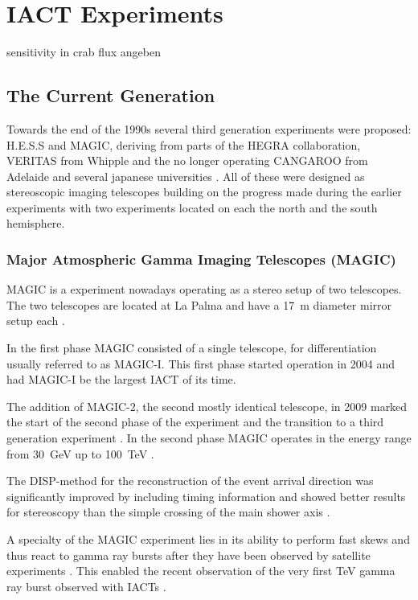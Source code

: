 \chapter{IACT Experiments}
\label{cta}

sensitivity in crab flux angeben

\section{The Current Generation}

Towards the end of the 1990s several third generation experiments were
proposed:
H.E.S.S and MAGIC, deriving from parts of the HEGRA collaboration, 
VERITAS from Whipple and the no longer operating CANGAROO from Adelaide and 
several japanese universities \cite{HILLAS201319}. All of these
were designed as stereoscopic imaging telescopes building on the progress made during the 
earlier experiments with two experiments located on each the north and the south hemisphere.

\subsection{Major Atmospheric Gamma Imaging Telescopes (MAGIC)}
MAGIC is a experiment nowadays operating as a stereo setup of two telescopes.
The two telescopes are located at La Palma and have a \SI{17}{\meter} diameter mirror setup each \cite{ALEKSIC201676}.

In the first phase MAGIC consisted of a single telescope, for differentiation usually
referred to as MAGIC-I. This first phase started 
operation in 2004 and had MAGIC-I be the largest IACT of its time.

The addition of MAGIC-2, the second mostly identical telescope, in 2009 marked the 
start of the second phase of the experiment and the transition to a third 
generation experiment \cite{2009arXiv0907.1211C}.
In the second phase MAGIC operates in the energy range from \SI{30}{\giga\eV}
up to \SI{100}{\TeV} \cite{magic_website}.

The DISP-method for the reconstruction of the event arrival direction 
was significantly improved by including timing information and showed better 
results for stereoscopy than the simple crossing of the main shower axis \cite{ALEKSIC2012435}.

A specialty of the MAGIC experiment lies in its ability to 
perform fast skews and thus react to gamma ray bursts after they have been observed 
by satellite experiments \cite{2003ICRC....5.2943B}.
This enabled the recent observation of the very first \si{\TeV}
gamma ray burst observed with IACTs \cite{collaboration2019teraelectronvolt}.


